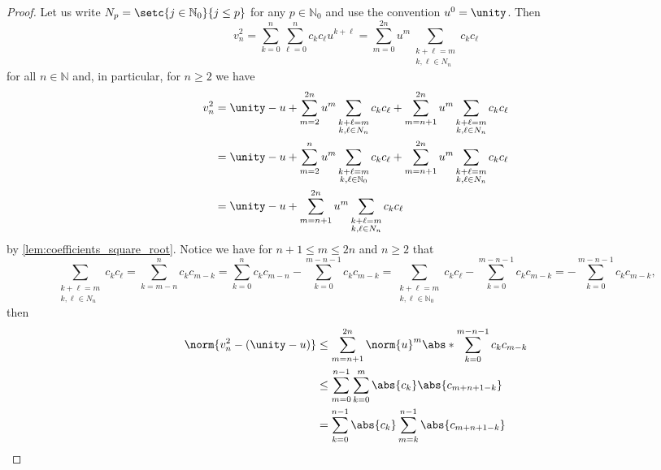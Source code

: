 \begin{proof}
    Let us write \(N_p = \setc{j \in \mathbb{N}_0}{j \leq p}\) for any \(p \in \mathbb{N}_0\) and use the convention \(u^0 = \unity\). Then
    \begin{equation*}
        v_n^2 = \sum_{k = 0}^n \sum_{\ell = 0}^n c_k c_\ell u^{k + \ell} = \sum_{m = 0}^{2n}u^m\sum_{\substack{k + \ell = m\\k, \ell \in N_n}} c_k c_\ell
    \end{equation*}
    for all \(n \in \mathbb{N}\) and, in particular, for \(n \geq 2\) we have
    \begin{align*}
        v_n^2 &= \unity - u + \sum_{m = 2}^{2n} u^m \sum_{\substack{k + \ell = m\\k, \ell \in N_n}}c_k c_\ell + \sum_{m = n + 1}^{2n} u^m \sum_{\substack{k + \ell = m\\k, \ell \in N_n}} c_k c_\ell\\
              &= \unity - u + \sum_{m = 2}^n u^m \sum_{\substack{k + \ell = m\\k,\ell \in \mathbb{N}_0}} c_k c_\ell + \sum_{m = n+1}^{2n} u^m \sum_{\substack{k + \ell = m\\k,\ell \in N_n}} c_k c_\ell\\
              &= \unity - u + \sum_{m = n+1}^{2n} u^m \sum_{\substack{k + \ell = m\\k,\ell \in N_n}} c_k c_\ell
    \end{align*}
    by \cref{lem:coefficients_square_root}. Notice we have for \(n + 1 \leq m \leq 2n\) and \(n \geq 2\) that
    \begin{equation*}
        \sum_{\substack{k + \ell = m\\k,\ell \in N_n}} c_k c_\ell = \sum_{k = m - n}^n c_k c_{m - k} = \sum_{k = 0}^n c_k c_{m - n} - \sum_{k = 0}^{m - n - 1} c_k c_{m - k} = \sum_{\substack{k + \ell = m\\k, \ell \in \mathbb{N}_0}} c_k c_\ell - \sum_{k = 0}^{m - n - 1} c_k c_{m - k} = - \sum_{k = 0}^{m - n - 1} c_k c_{m - k},
    \end{equation*}
    then
    \begin{align*}
        \norm{v_n^2 - (\unity - u)} &\leq \sum_{m = n + 1}^{2n} \norm{u}^m \abs*{\sum_{k = 0}^{m - n - 1} c_k c_{m-k}}\\
                                    &\leq \sum_{m = 0}^{n-1} \sum_{k = 0}^{m} \abs{c_k}\abs{c_{m+n+1-k}}\\
                                    &= \sum_{k = 0}^{n-1} \abs{c_k} \sum_{m = k}^{n-1} \abs{c_{m+n+1-k}}\\

\end{align*}
\end{proof}
